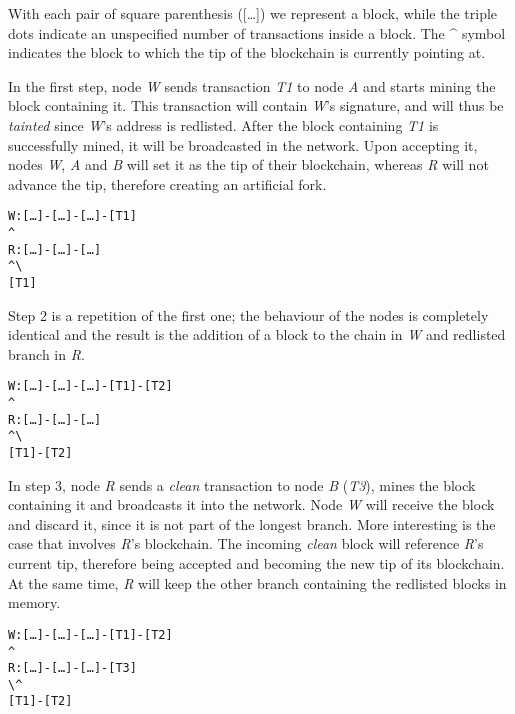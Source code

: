 \documentclass[12pt,journal,compsoc]{IEEEtran}
\begin{document}
With each pair of square parenthesis ([\ldots]) we represent a block, while the triple dots indicate an unspecified number of transactions inside a block. The \textasciicircum{} symbol indicates the block to which the tip of the blockchain is currently pointing at.

In the first step, node \emph{W} sends transaction \emph{T1} to node \emph{A} and starts mining the block containing it. This transaction will contain \emph{W}'s signature, and will thus be \emph{tainted} since \emph{W}'s address is redlisted. After the block containing \emph{T1} is successfully mined, it will be broadcasted in the network. Upon accepting it, nodes \emph{W}, \emph{A} and \emph{B} will set it as the tip of their blockchain, whereas \emph{R} will not advance the tip, therefore creating an artificial fork.
\newline
 \begin{alltt}
W:   [\ldots]\--[\ldots]\--[\ldots]\--\color{red}[T1]\color{black}
      		                 ^
R:   [\ldots]\--[\ldots]\--[\ldots]
      		            ^  \textbackslash
		                       \color{red}[T1]\color{black}
\end{alltt}

Step 2 is a repetition of the first one; the behaviour of the nodes is completely identical and the result is the addition of a block to the chain in \emph{W} and redlisted branch in \emph{R}.
\newline
 \begin{alltt}
W:   [\ldots]\--[\ldots]\--[\ldots]\--\color{red}[T1]\--[T2]\color{black}
      		                      ^
R:   [\ldots]\--[\ldots]\--[\ldots]
      		            ^  \textbackslash
		                       \color{red}[T1]\--[T2]\color{black}
\end{alltt}

In step 3, node \emph{R} sends a \emph{clean} transaction to node \emph{B} (\emph{T3}), mines the block containing it and broadcasts it into the network. Node \emph{W} will receive the block and discard it, since it is not part of the longest branch. More interesting is the case that involves \emph{R}'s blockchain. The incoming \emph{clean} block will reference \emph{R}'s current tip, therefore being accepted and becoming the new tip of its blockchain. At the same time, \emph{R} will keep the other branch containing the redlisted blocks in memory.
\newline
 \begin{alltt}
W:   [\ldots]\--[\ldots]\--[\ldots]\--\color{red}[T1]\--[T2]\color{black}
      		                      ^
R:   [\ldots]\--[\ldots]\--[\ldots]\--\color{darkgreen}[T3]\color{black}
      		               \textbackslash ^
		                       \color{red}[T1]\--[T2]\color{black}
\end{alltt}
\end{document}
